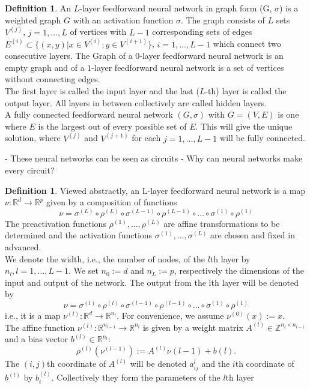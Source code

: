 \documentclass{article}
\theoremstyle{definition}
\newtheorem{definition}[theorem]{Definition}
\begin{document}
\begin{definition}
An $L$-layer feedforward neural network in graph form (G, $\sigma$) is a weighted graph $G$ with an activation function $\sigma$. The graph consists of $L$ sets $V^{(j)}$, $j = 1, \dots , L$ of vertices with $L-1$ corresponding sets of edges $E^{(i)} \subset \{(x,y)|x \in V^{(i)}; y \in V^{(i+1)}\}$, $i = 1, \dots , L-1$ which connect two consecutive layers.  The Graph of a $0$-layer feedforward neural network is an empty graph and of a $1$-layer feedforward neural network is a set of vertices without connecting edges. \\
The first layer is called the input layer and the last ($L$-th) layer is called the output layer. All layers in between collectively are called hidden layers. \\
A fully connected feedforward neural network $(G, \sigma)$ with $G = (V, E)$ is one where $E$ is the largest out of every possible set of $E$. This will give the unique solution, where $V^{(j)}$ and $V^{(j+1)}$ for each $j = 1, \dots , L-1$ will be fully connected.
\end{definition}





- These neural networks can be seen as circuits
- Why can neural networks make every circuit?

\cite{quine1955way}


\begin{definition}
Viewed abstractly, an L-layer feedforward neural network is a map $\nu : \mathbb{R}^{d} \to \mathbb{R}^{p}$ given by a composition of functions
$$ \nu = \sigma^{(L)} \circ \rho^{(L)} \circ \sigma^{(L-1)} \circ \rho^{(L-1)} \circ \dots \circ \sigma^{(1)} \circ \rho^{(1)}$$
The preactivation functions $\rho^{(1)}, \dots , \rho^{(L)}$ are affine transformations to be determined and the activation functions $\sigma^{(1)}, \dots , \sigma^{(L)}$ are chosen and fixed in advanced. \\
We denote the width, i.e., the number of nodes, of the $l$th
layer by $n_l, l = 1, \dots , L-1$. We set $n_0 := d$ and $n_L := p$, respectively the dimensions of the input and output of the network. The output from the lth layer will be denoted by
$$\nu = \sigma^{(l)} \circ \rho^{(l)} \circ \sigma^{(l-1)} \circ \rho^{(l-1)} \circ \dots \circ \sigma^{(1)} \circ \rho^{(1)}$$
i.e., it is a map $\nu^{(l)} : \mathbb{R}^{d} \to \mathbb{R}^{n_l}$. For convenience, we assume $\nu^{(0)}(x) := x$. \\
The affine function $\nu^{(l)} : \mathbb{R}^{n_{l-1}} \to \mathbb{R}^{n_{l}}$ is given by a weight matrix $A^{(l)} \in \mathbb{Z}^{n_l \times n_{l-1}} $ and a bias vector $b^{(l)} \in \mathbb{R}^{n_l}$:
$$ \rho^{(l)}(\nu^{(l-1)}) := A^{(l)} \nu{(l-1)} + b{(l)}. $$
The $(i, j)$th coordinate of $A^{(l)}$ will be denoted $a^{l}_{ij}$ and the $i$th coordinate of $b^{(l)}$ by $b^{(l)}_{i}$. Collectively they form the parameters of the $l$th layer
\end{definition}
\end{document}
